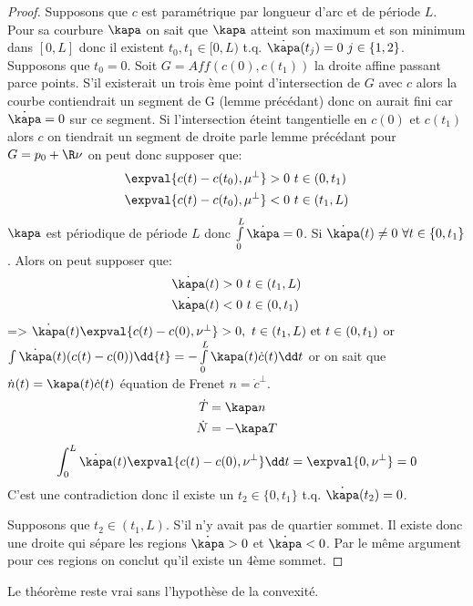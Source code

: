 				\begin{proof}
					Supposons que $c$ est paramétrique par longueur d'arc et de période $L$. Pour sa courbure $\kapa$ on sait que $\kapa$ atteint son maximum et son minimum dans $[0,L]$ donc il existent $t_0,t_1\in[0,L)$ t.q. $\dot\kapa(t_j)=0\ j\in\{1,2\}$. Supposons que $t_0=0$. Soit $G=Aff(c(0),c(t_1))$ la droite affine passant parce points. S'il existerait un trois ème point d'intersection de $G$ avec $c$ alors la courbe contiendrait un segment de G (lemme précédant) donc on aurait fini car $\dot\kapa=0$ sur ce segment. Si l'intersection éteint tangentielle en $c(0)$ et $c(t_1)$ alors $c$ on tiendrait un segment de droite parle lemme précédant pour $G=p_0+\R\nu$ on peut donc supposer que:
					\begin{align}		
						\expval{c(t)-c(t_0),\mu^\perp}>0\ & t\in(0,t_1)\\
						\expval{c(t)-c(t_0),\mu^\perp}<0\ & t\in(t_1,L)
					\end{align}
					$\kapa$ est périodique de période $L$ donc $\int\limits_0^L\dot\kapa=0$. Si $\dot\kapa(t)\neq 0\ \forall t\in\{0,t_1\}$. Alors on peut supposer que:
					\begin{align*}
						\dot\kapa (t)>0\ &t\in(t_1,L)\\
						\dot\kapa (t)<0\ &t\in(0,t_1)
					\end{align*}
					=> $\dot\kapa(t)\expval{c(t)-c(0),\nu^\perp}>0,\ t\in(t_1,L)\text{ et }t\in(0,t_1)$ or $\int\dot\kapa(t)(c(t)-c(0))\dd{t}=-\int\limits_0^L\kapa(t)\dot c(t)\dd t$ or on sait que $\dot n(t)=\kapa(t)\dot c(t)$ équation de Frenet $n=\dot c^\perp$.
					\begin{align*}
						\dot T&=\kapa n\\
						\dot N&=-\kapa T
					\end{align*}
					$$\int_0^L\dot\kapa(t)\expval{c(t)-c(0),\nu^\perp}\dd t=\expval{0,\nu^\perp}=0$$
					C'est une contradiction donc il existe un $t_2\in\{0,t_1\}$ t.q. $\dot\kapa(t_2)=0$.

					Supposons que $t_2\in(t_1,L)$. S'il n'y avait pas de quartier sommet. Il existe donc une droite qui sépare les regions $\dot\kapa>0$ et $\dot\kapa<0$. Par le même argument pour ces regions on conclut qu'il existe un 4ème sommet.
				\end{proof}

				\begin{remark}
					Le théorème reste vrai sans l'hypothèse de la convexité.
				\end{remark}

